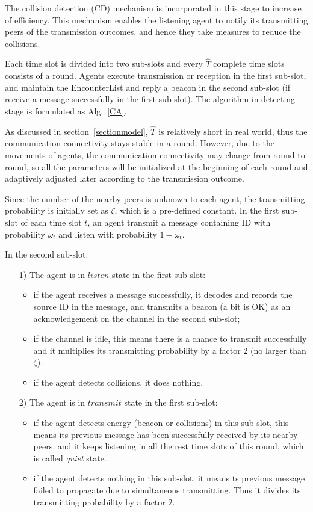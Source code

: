 The collision detection (CD) mechanism is incorporated in this stage 
to increase of efficiency. This mechanism enables the listening agent 
to notify its transmitting peers of the transmission outcomes, 
and hence they take measures to reduce the collisions.

Each time slot is divided into two sub-slots and every 
$\hat{T}$ complete time slots consists of a round.
Agents execute transmission or reception in the first sub-slot, 
and maintain the EncounterList and reply a beacon in the second sub-slot (if receive a message 
successfully in the first sub-slot). The algorithm in detecting stage is formulated as Alg.~\ref{CA}.

As discussed in section~\ref{sectionmodel}, $\hat{T}$ is relatively short in 
real world, thus the communication connectivity stays stable in a round. 
However, due to the movements of agents, the communication connectivity
may change from round to round, so all the parameters will be 
initialized at the beginning of each round and adaptively adjusted later 
according to the transmission outcome.

Since the number of the nearby peers is unknown to each agent, 
the transmitting probability is initially set as $\zeta$, which is a pre-defined constant.
In the first sub-slot of each time slot $t$, an agent transmit a message containing ID 
with probability $\omega_t$ and listen with probability $1 - \omega_t$. 

In the second sub-slot: 
\begin{itemize}
    \item[1)] The agent is in $listen$ state in the first sub-slot:
    \begin{itemize}
    \item if the agent receives a message successfully, it 
    decodes and records the source ID in the message, and
    transmits a beacon (a bit is OK) as an acknowledgement 
    on the channel in the second sub-slot; 
    \item if the channel is idle, this means there is a chance to 
    transmit successfully and it multiplies its transmitting 
    probability by a factor $2$ (no larger than $\zeta$).
    \item if the agent detects collisions, it does nothing.
    \end{itemize}
    \item[2)] The agent is in $transmit$ state in the first sub-slot:
    \begin{itemize}
    \item if the agent detects energy (beacon or collisions) in this sub-slot,
    this means its previous message has been successfully received by its nearby
    peers, and it keeps listening in all the rest time slots of this round,
    which is called \emph{quiet} state.
    \item if the agent detects nothing in this sub-slot, it means ts previous message
    failed to propagate due to simultaneous transmitting. Thus it divides its transmitting 
    probability by a factor $2$. 
    \end{itemize}
\end{itemize}

